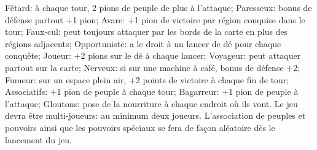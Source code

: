 \documentclass[a4paper, 11pt]{article}
\begin{document}
Fêtard: à chaque tour, 2 pions de peuple de plus à l’attaque;
Paresseux: bonus de défense partout +1 pion;
Avare: +1 pion de victoire par région conquise dans le tour;
Faux-cul: peut toujours attaquer par les bords de la carte en plus des régions adjacents;
Opportuniste: a le droit à un lancer de dé pour chaque conquête;
Joueur: +2 pions sur le dé à chaque lancer;
Voyageur: peut attaquer partout sur la carte;
Nerveux: si sur une machine à café, bonus de défense +2;
Fumeur: sur un espace plein air, +2 points de victoire à chaque fin de tour;
Associatifs: +1 pion de peuple à chaque tour;
Bagarreur: +1 pion de peuple à l’attaque;
Gloutons: pose de la nourriture à chaque endroit où ils vont.
Le jeu devra être multi-joueurs: au minimum deux joueurs. L'association de peuples et pouvoirs ainsi que les pouvoirs spéciaux se fera de façon aléatoire dès le lancement du jeu.



	
\end{document}

